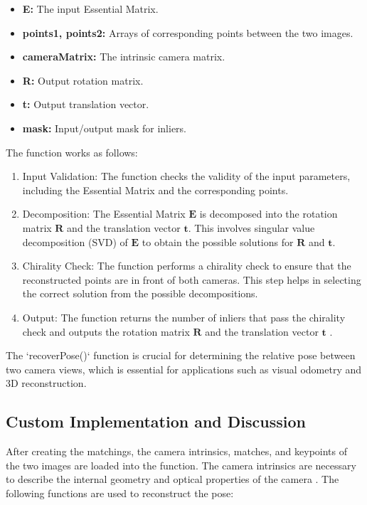 \documentclass[conference, a4paper]{IEEEtran}
\begin{document}
\begin{itemize}
	\item\textbf{E:} The input Essential Matrix.
	\item\textbf{points1, points2:} Arrays of corresponding points between the two images.
	\item\textbf{cameraMatrix:} The intrinsic camera matrix.
	\item\textbf{R:} Output rotation matrix.
	\item\textbf{t:} Output translation vector.
	\item\textbf{mask:} Input/output mask for inliers.
\end{itemize}

The function works as follows:
\begin{enumerate}
	\item Input Validation: The function checks the validity of the input parameters, including the Essential Matrix and the corresponding points.
	\item Decomposition: The Essential Matrix \( \mathbf{E} \) is decomposed into the rotation matrix \( \mathbf{R} \) and the translation vector \( \mathbf{t} \). This involves singular value decomposition (SVD) of \( \mathbf{E} \) to obtain the possible solutions for \( \mathbf{R} \) and \( \mathbf{t} \).
	\item Chirality Check: The function performs a chirality check to ensure that the reconstructed points are in front of both cameras. This step helps in selecting the correct solution from the possible decompositions.
	\item Output: The function returns the number of inliers that pass the chirality check and outputs the rotation matrix \( \mathbf{R} \) and the translation vector \( \mathbf{t} \) \cite{opencv_recoverPose}.
\end{enumerate}

The `recoverPose()` function is crucial for determining the relative pose between two camera views, which is essential for applications such as visual odometry and 3D reconstruction.

\subsection{Custom Implementation and Discussion}
After creating the matchings, the camera intrinsics, matches, and keypoints of the two images are loaded into the function. The camera intrinsics are necessary to describe the internal geometry and optical properties of the camera \cite{repo1}. The following functions are used to reconstruct the pose:
\end{document}
